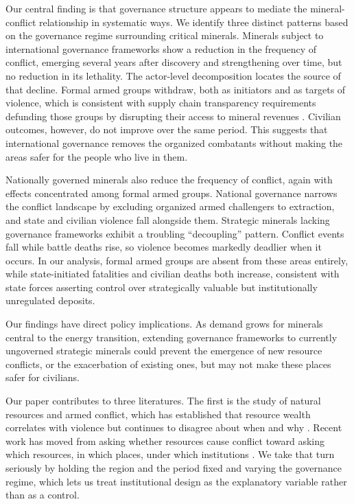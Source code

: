\documentclass[11pt]{article}
\begin{document}
Our central finding is that governance structure appears to mediate the mineral-conflict relationship in systematic ways. We identify three distinct patterns based on the governance regime surrounding critical minerals. Minerals subject to international governance frameworks show a reduction in the frequency of conflict, emerging several years after discovery and strengthening over time, but no reduction in its lethality. The actor-level decomposition locates the source of that decline. Formal armed groups withdraw, both as initiators and as targets of violence, which is consistent with supply chain transparency requirements defunding those groups by disrupting their access to mineral revenues \citep{parker2016resource, stoop2018dodd, bloem2022conflict}. Civilian outcomes, however, do not improve over the same period. This suggests that international governance removes the organized combatants without making the areas safer for the people who live in them.

Nationally governed minerals also reduce the frequency of conflict, again with effects concentrated among formal armed groups. National governance narrows the conflict landscape by excluding organized armed challengers to extraction, and state and civilian violence fall alongside them. Strategic minerals lacking governance frameworks exhibit a troubling ``decoupling'' pattern. Conflict events fall while battle deaths rise, so violence becomes markedly deadlier when it occurs. In our analysis, formal armed groups are absent from these areas entirely, while state-initiated fatalities and civilian deaths both increase, consistent with state forces asserting control over strategically valuable but institutionally unregulated deposits.

Our findings have direct policy implications. As demand grows for minerals central to the energy transition, extending governance frameworks to currently ungoverned strategic minerals could prevent the emergence of new resource conflicts, or the exacerbation of existing ones, but may not make these places safer for civilians.

Our paper contributes to three literatures. The first is the study of natural resources and armed conflict, which has established that resource wealth correlates with violence but continues to disagree about when and why \citep{ross2004does, collier2004greed, fearon2005primary, lujala2009deadly, lujala2010spoils}. Recent work has moved from asking whether resources cause conflict toward asking which resources, in which places, under which institutions \citep{berman2017mine, sanchez2020mining, bazzi2019promises}. We take that turn seriously by holding the region and the period fixed and varying the governance regime, which lets us treat institutional design as the explanatory variable rather than as a control.
\end{document}

